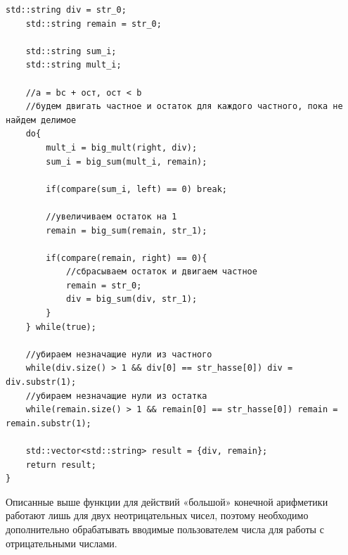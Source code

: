 \begin{lstlisting}[caption=big\_diff и big\_div, label=lst:big-diff и big-div]
    std::string div = str_0;
    std::string remain = str_0;

    std::string sum_i;
    std::string mult_i;

    //a = bc + ост, ост < b
    //будем двигать частное и остаток для каждого частного, пока не найдем делимое
    do{
        mult_i = big_mult(right, div);
        sum_i = big_sum(mult_i, remain);

        if(compare(sum_i, left) == 0) break;

        //увеличиваем остаток на 1
        remain = big_sum(remain, str_1);

        if(compare(remain, right) == 0){
            //сбрасываем остаток и двигаем частное
            remain = str_0;
            div = big_sum(div, str_1);
        }
    } while(true);

    //убираем незначащие нули из частного
    while(div.size() > 1 && div[0] == str_hasse[0]) div = div.substr(1);
    //убираем незначащие нули из остатка
    while(remain.size() > 1 && remain[0] == str_hasse[0]) remain = remain.substr(1);

    std::vector<std::string> result = {div, remain};
    return result;
}
\end{lstlisting}



 \par
Описанные выше функции для действий «большой» конечной арифметики работают лишь для двух неотрицательных чисел, поэтому необходимо дополнительно обрабатывать вводимые пользователем числа для работы с отрицательными числами. \par
\vspace{10pt}

